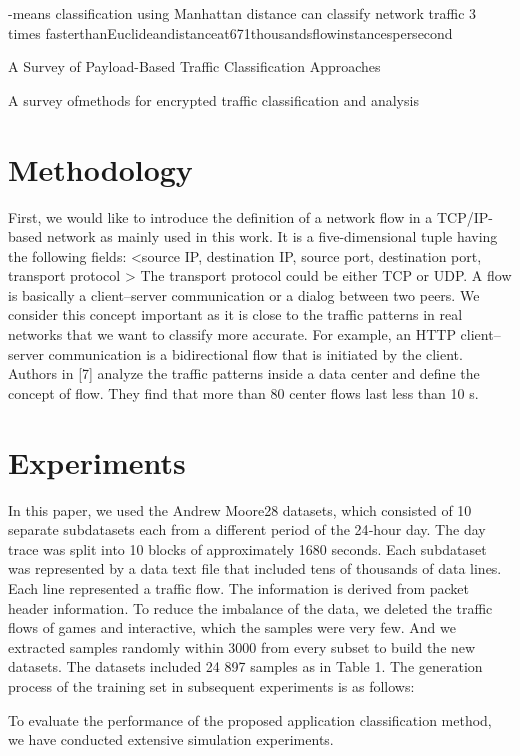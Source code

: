 \documentclass[10pt,journal,compsoc]{IEEEtran}
\begin{document}
-means classification using Manhattan distance can classify network traffic 3 times
fasterthanEuclideandistanceat671thousandsflowinstancespersecond

\cite{Finsterbusch2014}
A Survey of Payload-Based Traffic
Classification Approaches

\cite{Siqueira2014}
{A survey ofmethods for encrypted traffic classification and analysis}


\section{Methodology}
First, we would like to introduce the definition of a network flow in a TCP/IP-based network as mainly
used in this work. It is a five-dimensional tuple having the following fields:
<source IP, destination IP, source port, destination port, transport protocol >
The transport protocol could be either TCP or UDP. A flow is basically a client–server communication or a dialog between two peers. We consider this concept important as it is close to the traffic
patterns in real networks that we want to classify more accurate. For example, an HTTP client–server
communication is a bidirectional flow that is initiated by the client. Authors in [7] analyze the traffic
patterns inside a data center and define the concept of flow. They find that more than 80%
center flows last less than 10 s.

\section{Experiments}


In this paper, we used the Andrew Moore28 datasets, which
consisted of 10 separate subdatasets each from a different
period of the 24‐hour day. The day trace was split into 10
blocks of approximately 1680 seconds. Each subdataset was
represented by a data text file that included tens of thousands
of data lines. Each line represented a traffic flow. The information is derived from packet header information.
To reduce the imbalance of the data, we deleted the traffic
flows of games and interactive, which the samples were very
few. And we extracted samples randomly within 3000 from
every subset to build the new datasets. The datasets included
24 897 samples as in Table 1. The generation process of the
training set in subsequent experiments is as follows:


To evaluate the performance of the proposed application classification method, we have conducted extensive simulation
experiments.
\end{document}
